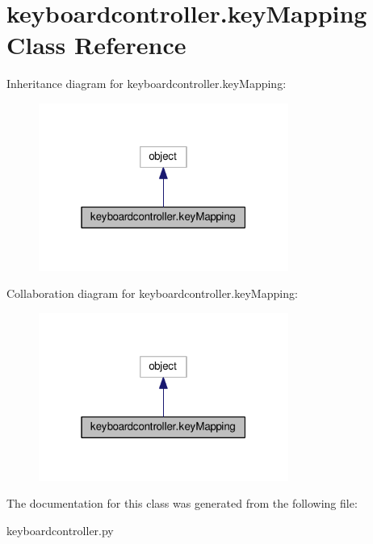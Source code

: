 \hypertarget{classkeyboardcontroller_1_1keyMapping}{\section{keyboardcontroller.\-key\-Mapping Class Reference}
\label{classkeyboardcontroller_1_1keyMapping}
}


Inheritance diagram for keyboardcontroller.\-key\-Mapping\-:
\nopagebreak
\begin{figure}[H]
\begin{center}
\leavevmode
\includegraphics[width=232pt]{classkeyboardcontroller_1_1keyMapping__inherit__graph}
\end{center}
\end{figure}


Collaboration diagram for keyboardcontroller.\-key\-Mapping\-:
\nopagebreak
\begin{figure}[H]
\begin{center}
\leavevmode
\includegraphics[width=232pt]{classkeyboardcontroller_1_1keyMapping__coll__graph}
\end{center}
\end{figure}


The documentation for this class was generated from the following file\-:\begin{DoxyCompactItemize}
\item 
keyboardcontroller.\-py\end{DoxyCompactItemize}
